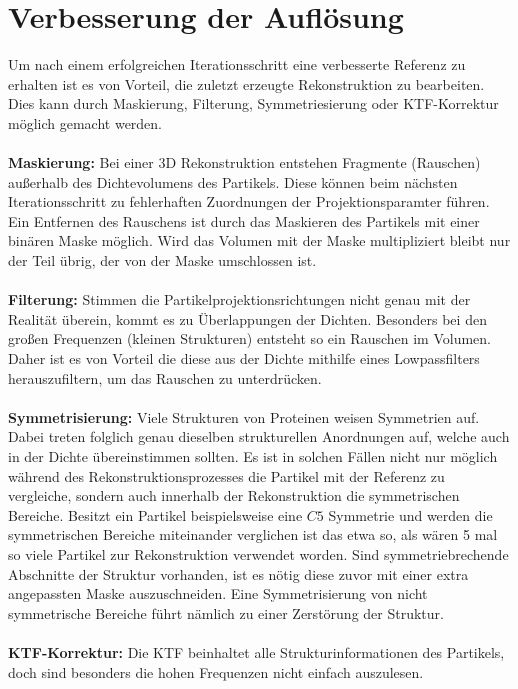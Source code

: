 \section{Verbesserung der Auflösung} %
\label{sec:verbesserung_der_aufloesung}

Um nach einem erfolgreichen Iterationsschritt eine verbesserte Referenz zu erhalten ist es von Vorteil, die zuletzt erzeugte Rekonstruktion zu bearbeiten.
Dies kann durch Maskierung, Filterung, Symmetriesierung oder KTF-Korrektur möglich gemacht werden.
\\
\\
\textbf{Maskierung:} Bei einer 3D Rekonstruktion entstehen Fragmente (Rauschen) außerhalb des Dichtevolumens des Partikels. 
Diese können beim nächsten Iterationsschritt zu fehlerhaften Zuordnungen der Projektionsparamter führen.
Ein Entfernen des Rauschens ist durch das Maskieren des Partikels mit einer binären Maske möglich.
Wird das Volumen mit der Maske multipliziert bleibt nur der Teil übrig, der von der Maske umschlossen ist.
\\
\\
\textbf{Filterung:} Stimmen die Partikelprojektionsrichtungen nicht genau mit der Realität überein, kommt es zu Überlappungen der Dichten.
Besonders bei den großen Frequenzen (kleinen Strukturen) entsteht so ein Rauschen im Volumen.
Daher ist es von Vorteil die diese aus der Dichte mithilfe eines Lowpassfilters herauszufiltern, um das Rauschen zu unterdrücken.
\\
\\
\textbf{Symmetrisierung:} Viele Strukturen von Proteinen weisen Symmetrien auf.
Dabei treten folglich genau dieselben strukturellen Anordnungen auf, welche auch in der Dichte übereinstimmen sollten.
Es ist in solchen Fällen nicht nur möglich während des Rekonstruktionsprozesses die Partikel mit der Referenz zu vergleiche, sondern auch innerhalb der Rekonstruktion die symmetrischen Bereiche. 
Besitzt ein Partikel beispielsweise eine $C5$ Symmetrie und werden die symmetrischen Bereiche miteinander verglichen ist das etwa so, als wären 5 
mal so viele Partikel zur Rekonstruktion verwendet worden.
Sind symmetriebrechende Abschnitte der Struktur vorhanden, ist es nötig diese zuvor mit einer extra angepassten Maske auszuschneiden.
Eine Symmetrisierung von nicht symmetrische Bereiche führt nämlich zu einer Zerstörung der Struktur.
\\
\\
\textbf{KTF-Korrektur:} Die KTF beinhaltet alle Strukturinformationen des Partikels, doch sind besonders die hohen Frequenzen nicht einfach auszulesen.
